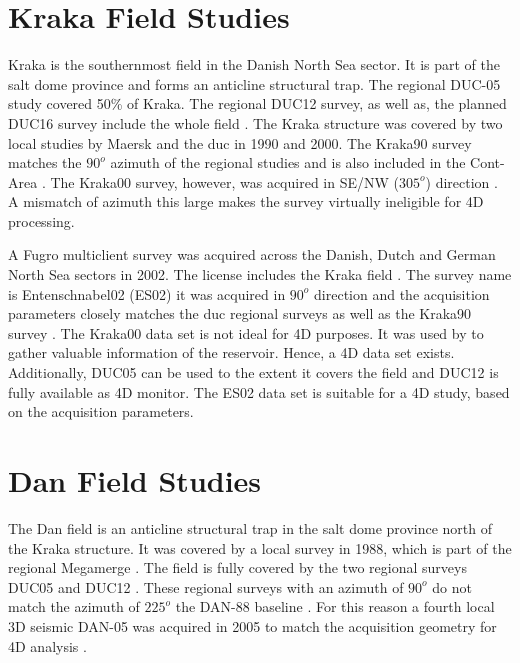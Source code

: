 \section{Kraka Field Studies}

Kraka is the southernmost field in the Danish North Sea sector. It is part of the salt dome province and forms an anticline structural trap. The regional DUC-05 study covered 50\% of Kraka. The regional DUC12 survey, as well as, the planned DUC16 survey include the whole field \citep{Klinkby2005,GEUSdata}. The Kraka structure was covered by two local studies by Maersk and the \ac{duc} in 1990 and 2000. The Kraka90 survey matches the $90^o$ azimuth of the regional studies and is also included in the Cont-Area  \citep{Jakobsen2010}. The Kraka00 survey, however, was acquired in SE/NW ($305^o$) direction \citep{GEUSdata}. A mismatch of azimuth this large makes the survey virtually ineligible for 4D processing.

A Fugro multiclient survey was acquired across the Danish, Dutch and German North Sea sectors in 2002. The license includes the Kraka field  \citep{Jakobsen2010}. The survey name is Entenschnabel02 (ES02) it was acquired in $90^o$ direction and the acquisition parameters closely matches the \ac{duc} regional surveys as well as the Kraka90 survey \citep{GEUSdata}. The Kraka00 data set is not ideal for 4D purposes. It was used by \citet{Dorn-Lopez2005} to gather valuable information of the reservoir. Hence, a 4D data set exists. Additionally, DUC05 can be used to the extent it covers the field and DUC12 is fully available as 4D monitor. The ES02 data set is suitable for a 4D study, based on the acquisition parameters.


\section{Dan Field Studies}
The Dan field is an anticline structural trap in the salt dome province north of the Kraka structure. It was covered by a local survey in 1988, which is part of the regional Megamerge \citep{Klinkby2005}. The field is fully covered by the two regional surveys DUC05 and DUC12 \citep{Micksch2014, Zaske2014}. These regional surveys with an azimuth of $90^o$ do not match the azimuth of $225^o$ the DAN-88 baseline \citep{Zaske2014}. For this reason a fourth local 3D seismic DAN-05 was acquired in 2005 to match the acquisition geometry for 4D analysis \citep{Zaske2014}.

